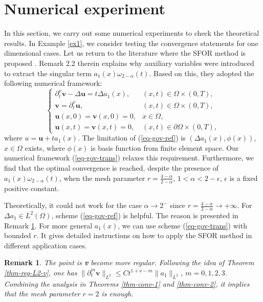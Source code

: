 \documentclass[11pt]{article}
\newtheorem{remark}{Remark}[section]
\numberwithin{equation}{section}
\begin{document}
\section{Numerical experiment}\label{sec-num}
In this section, we carry out some numerical experiments to check the theoretical results. 
In Example \ref{ex1}, we consider testing the convergence statements for one dimensional cases. 
Let us return to the literature where the SFOR method is proposed \cite{LyuP2022SFOR}. Remark 2.2 therein explains why auxiliary variables were introduced to extract the singular term $a_1(x)\omega_{2-\alpha}(t)$. Based on this, they adopted the following numerical framework:
\begin{equation}\label{eq-gov-ref}
\begin{cases}
  \partial_t^\nu \textbf{v}  - \Delta \textbf{u} = t\Delta a_1(x), & (x,t) \in \Omega \times (0,T), \\
  \textbf{v}  = \partial_t^\nu \textbf{u}, & (x,t) \in \Omega \times (0,T), \\
  \textbf{u}(x,0) = \textbf{v}(x,0)=0, & x \in \Omega, \\
  \textbf{u}(x,t) = \textbf{v}(x,t)=0, & (x,t) \in \partial \Omega \times (0,T),
\end{cases}
\end{equation}
where $u=\textbf{u}+ta_1(x)$. The limitation of (\ref{eq-gov-ref}) is $(\Delta a_1(x),\phi(x))$, $x\in\Omega$ exists, where $\phi(x)$ is basis function from finite element space.
Our numerical framework (\ref{eq-gov-trans}) relaxes this requirement. Furthermore, we find that the optimal convergence is reached, despite the presence of $a_1(x)\omega_{2-\alpha}(t)$, when the mesh parameter $r=\frac{4-\alpha}{2-\alpha}$, $1<\alpha<2-\epsilon$, $\epsilon$ is a fixed positive constant. 

Theoretically, it could not work for the case $\alpha\rightarrow2^-$ since $r=\frac{4-\alpha}{2-\alpha}\rightarrow +\infty$. For  $\Delta a_1\in L^2(\Omega)$, scheme (\ref{eq-gov-ref}) is helpful. The reason is presented in Remark \ref{ill-ref}. For more general $a_1(x)$, we can use scheme (\ref{eq-gov-trans}) with bounded $r$. It gives detailed instructions on how to apply the SFOR method in different application cases.

\begin{remark}\label{ill-ref}
The point is \textbf{v} become more regular. Following the idea of Theorem \ref{thm-reg-L2-v}, one has 
$\|\partial_t^m\textbf{v}\|_{L^2}\leq Ct^{1+\nu-m}\|a_1\|_{L^2}$, $m=0,1,2,3$. Combining the analysis in Theorems \ref{thm-conv-1} and \ref{thm-conv-2}, it implies that the mesh parameter $r=2$ is enough.
\end{remark}
\end{document}
